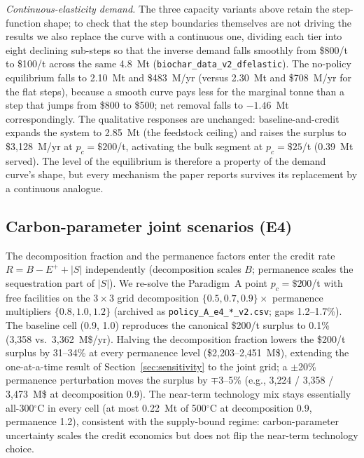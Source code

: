 \emph{Continuous-elasticity demand.} The three capacity variants above retain
the step-function shape; to check that the step boundaries themselves are not
driving the results we also replace the curve with a continuous one, dividing
each tier into eight declining sub-steps so that the inverse demand falls
smoothly from \$800/t to \$100/t across the same 4.8~Mt
(\texttt{biochar\_data\_v2\_dfelastic}). The no-policy equilibrium falls to
2.10~Mt and \$483~M/yr (versus 2.30~Mt and \$708~M/yr for the flat steps),
because a smooth curve pays less for the marginal tonne than a step that
jumps from \$800 to \$500; net removal falls to $-1.46$~Mt correspondingly.
The qualitative responses are unchanged: baseline-and-credit expands the
system to 2.85~Mt (the feedstock ceiling) and raises the surplus to
\$3{,}128~M/yr at $p_c=\$200$/t, activating the bulk segment at
$p_c=\$25$/t (0.39~Mt served). The level of the equilibrium is therefore a
property of the demand curve's shape, but every mechanism the paper reports
survives its replacement by a continuous analogue.

\subsection{Carbon-parameter joint scenarios (E4)}

The decomposition fraction and the permanence factors enter the credit rate
$R=B-E^{+}+|S|$ independently (decomposition scales $B$; permanence scales the
sequestration part of $|S|$). We re-solve the Paradigm~A point $p_c=\$200$/t
with free facilities on the $3\times3$ grid decomposition
$\{0.5,0.7,0.9\}\times$ permanence multipliers $\{0.8,1.0,1.2\}$
(archived as \texttt{policy\_A\_e4\_*\_v2.csv}; gaps 1.2--1.7\%). The baseline
cell (0.9, 1.0) reproduces the canonical \$200/t surplus to 0.1\%
(3{,}358 vs.\ 3{,}362~M\$/yr). Halving the decomposition fraction lowers the
\$200/t surplus by 31--34\% at every permanence level (\$2{,}203--2{,}451~M\$),
extending the one-at-a-time result of Section~\ref{sec:sensitivity} to the
joint grid; a $\pm$20\% permanence perturbation moves the surplus by
$\mp$3--5\% (e.g., 3{,}224 / 3{,}358 / 3{,}473~M\$ at decomposition 0.9).
The near-term technology mix stays essentially all-300$^\circ$C in every cell
(at most 0.22~Mt of 500$^\circ$C at decomposition 0.9, permanence 1.2),
consistent with the supply-bound regime: carbon-parameter uncertainty scales
the credit economics but does not flip the near-term technology choice.

